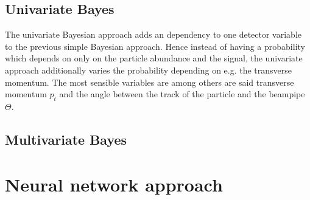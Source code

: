\subsection{Univariate Bayes}
\label{subsec:bayesian_approach_univariate_bayes}

The univariate Bayesian approach adds an dependency to one detector variable to the previous simple Bayesian approach. Hence instead of having a probability which depends on only on the particle abundance and the signal, the univariate approach additionally varies the probability depending on e.g. the transverse momentum. The most sensible variables are among others are said transverse momentum $p_t$ and the angle between the track of the particle and the beampipe $\Theta$.

\subsection{Multivariate Bayes}
\label{subsec:bayesian_approach_multivariate_bayes}

\section{Neural network approach}
\label{sec:neural_network_approach}
